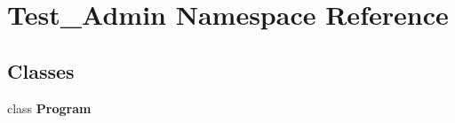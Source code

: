 \hypertarget{namespaceTest__Admin}{}\section{Test\+\_\+\+Admin Namespace Reference}
\label{namespaceTest__Admin}
\subsection*{Classes}
\begin{DoxyCompactItemize}
\item 
class {\bfseries Program}
\end{DoxyCompactItemize}
